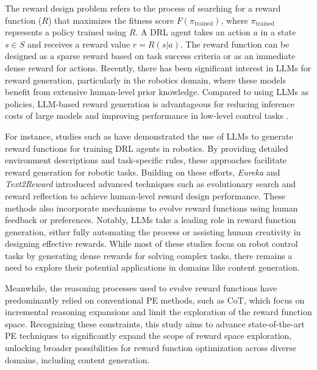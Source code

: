 
The reward design problem \cite{lewis2010rewards} refers to the process of searching for a reward function ($R$) that maximizes the fitness score $F(\pi_{\text{trained}})$, where $\pi_{\text{trained}}$ represents a policy trained using $R$.
A DRL agent takes an action $a$ in a state $s\in{}S$ and receives a reward value $r=R(s|a)$.
The reward function can be designed as a sparse reward based on task success criteria or as an immediate dense reward for actions.
Recently, there has been significant interest in LLMs for reward generation, particularly in the robotics domain, where these models benefit from extensive human-level prior knowledge. Compared to using LLMs as policies, LLM-based reward generation is advantageous for reducing inference costs of large models and improving performance in low-level control tasks \cite{ahn2022can, singh2023progprompt}.

For instance, studies such as \cite{yu2023language, zeng2023learning, song2023self} have demonstrated the use of LLMs to generate reward functions for training DRL agents in robotics. By providing detailed environment descriptions and task-specific rules, these approaches facilitate reward generation for robotic tasks. Building on these efforts, \textit{Eureka} \cite{ma2023eureka} and \textit{Text2Reward} \cite{xie2023text2reward} introduced advanced techniques such as evolutionary search and reward reflection to achieve human-level reward design performance. These methods also incorporate mechanisms to evolve reward functions using human feedback or preferences.
Notably, LLMs take a leading role in reward function generation, either fully automating the process or assisting human creativity in designing effective rewards.
While most of these studies focus on robot control tasks by generating dense rewards for solving complex tasks, there remains a need to explore their potential applications in domains like content generation.

Meanwhile, the reasoning processes used to evolve reward functions have predominantly relied on conventional PE methods, such as CoT, which focus on incremental reasoning expansions and limit the exploration of the reward function space. Recognizing these constraints, this study aims to advance state-of-the-art PE techniques to significantly expand the scope of reward space exploration, unlocking broader possibilities for reward function optimization across diverse domains, including content generation.
